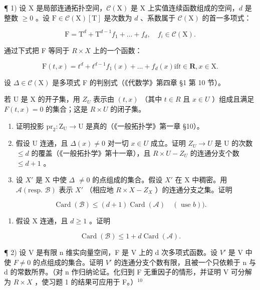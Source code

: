
¶ 1) 设 X 是局部连通拓扑空间，\(\mathcal{C}(\mathrm{X})\) 是 X 上实值连续函数组成的空间，\(d\) 是整数 \(\geq 0\) 。设 \(\mathrm{F} \in \mathcal{C}(\mathrm{X})[\mathrm{T}]\) 是次数为 \(d\) 、系数属于 \(\mathcal{C}(\mathrm{X})\) 的首一多项式：

\[
\mathrm{F} = \mathrm{T} ^ {d} + \mathrm{T} ^ {d - 1} f _ {1} + \dots + f _ {d}, \quad f _ {i} \in \mathcal {C} (\mathrm{X}).
\]

通过下式把 F 等同于 \(R \times X\) 上的一个函数：

\[
\mathrm{F} (t, x) = t ^ {d} + t ^ {d - 1} f _ {1} (x) + \dots + f _ {d} (x) \text {if} t \in \mathbf {R}, x \in \mathrm{X}.
\]

设 \(\Delta \in \mathcal{C}(\mathrm{X})\) 是多项式 F 的判别式（《代数学》第四章 §1 第 10 节）。

若 U 是 X 的开子集，用 \(Z_{U}\) 表示由 \((t,x)\) （其中 \(t \in R\) 且 \(x \in U\) ）组成且满足 \(F(t,x) = 0\) 的集合；这是 \(R \times U\) 的闭子集。

\begin{enumerate}
\def\labelenumi{\alph{enumi})}
\item
  证明投影 \(\mathrm{pr}_2: \mathrm{Z}_{\mathrm{U}} \to \mathrm{U}\) 是真的（《一般拓扑学》第一章 §10）。
\item
  假设 U 连通，且 \(\Delta(x) \neq 0\) 对一切 \(x \in U\) 成立。证明 \(Z_{U} \to U\) 是 U 的次数 \(\leq d\) 的覆盖（《一般拓扑学》第十一章），且 \(R \times U - Z_{U}\) 的连通分支个数 \(\leq d + 1\) 。
\item
  设 \(X'\) 是 X 中使 \(\Delta\) \(\neq 0\) 的点组成的集合。假设 \(X'\) 在 X 中稠密。用 \(\mathcal{A}(\text{resp. } \mathcal{B})\) 表示 \(X'\) （相应地 \(R \times X - Z_{X}\) ）的连通分支之集。证明
\end{enumerate}

\[
\operatorname{Card} (\mathscr {B}) \leq (d + 1) \operatorname{Card} (\mathscr {A}) \quad (\text { use   } b)).
\]

\begin{enumerate}
\def\labelenumi{\alph{enumi})}
\setcounter{enumi}{3}
\tightlist
\item
  假设 X 连通，且 \(d \geq 1\) 。证明
\end{enumerate}

\[
\operatorname{Card} (\mathcal {B}) \leq 1 + d \operatorname{Card} (\mathcal {A}).
\]

¶ 2) 设 V 是有限 n 维实向量空间，F 是 V 上的 d 次多项式函数。设 \(V'\) 是 V 中使 \(F \neq 0\) 的点组成的集合。证明 \(V'\) 的连通分支个数有限，且被一个只依赖于 n 与 d 的常数所界。（对 n 作归纳论证。化归到 F 无重因子的情形，并证明 V 可分解为 \(R \times X\) ，使习题 1 的结果可应用于 F。）\(^{10}\)

